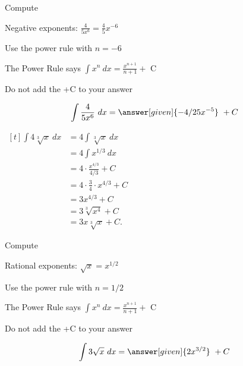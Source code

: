 \documentclass{ximera}
\begin{document}
\begin{problem} %
Compute 

\begin{hint}
Negative exponents: $\frac{4}{5x^6} = \frac45 x^{-6}$
\end{hint}
\begin{hint}
Use the power rule with $n=-6$
\end{hint}
\begin{hint}
The Power Rule says $\int x^n \ dx = \frac{x^{n+1}}{n+1} +$ C
\end{hint}
\begin{hint}
\begin{center}
Do not add the +C to your answer
\end{center}
\end{hint}

\[
\int \frac{4}{5x^6} \ dx =
\answer[given]{-4/25 x^{-5}} \ + C
\]
\end{problem}


\begin{example} %
$\begin{aligned}[t]
\int 4\sqrt[3]x  \ dx &= 4 \int \sqrt[3] x \  dx  \\
&= 4 \int x^{1/3} \ dx \\
&= 4 \cdot \frac{x^{4/3}}{4/3} +C \\[3pt]
&= 4 \cdot \frac{3}{4} \cdot x^{4/3} +C \\[3pt]
&= 3x^{4/3} +C \\
&= 3\sqrt[3] {x^4} +C \\
&= 3x\sqrt[3] x +C.
\end{aligned}$
\end{example}


\begin{problem} %
Compute 

\begin{hint}
Rational exponents: $\sqrt x = x^{1/2}$
\end{hint}
\begin{hint}
Use the power rule with $n=1/2$
\end{hint}
\begin{hint}
The Power Rule says $\int x^n \ dx = \frac{x^{n+1}}{n+1} +$ C
\end{hint}
\begin{hint}
\begin{center}
Do not add the +C to your answer
\end{center}
\end{hint}

\[
\int 3\sqrt x \ dx =
\answer[given]{2x^{3/2}} \ + C
\]
\end{problem}
\end{document}
